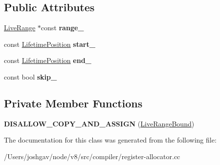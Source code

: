 \subsection*{Public Attributes}
\begin{DoxyCompactItemize}
\item 
\hyperlink{classv8_1_1internal_1_1compiler_1_1_live_range}{Live\+Range} $\ast$const {\bfseries range\+\_\+}\hypertarget{classv8_1_1internal_1_1compiler_1_1_live_range_bound_a31adf66742f8c0b7101392328558ba8a}{}\label{classv8_1_1internal_1_1compiler_1_1_live_range_bound_a31adf66742f8c0b7101392328558ba8a}

\item 
const \hyperlink{classv8_1_1internal_1_1compiler_1_1_lifetime_position}{Lifetime\+Position} {\bfseries start\+\_\+}\hypertarget{classv8_1_1internal_1_1compiler_1_1_live_range_bound_ad9828b4ba38126285be60185a0d3e0f8}{}\label{classv8_1_1internal_1_1compiler_1_1_live_range_bound_ad9828b4ba38126285be60185a0d3e0f8}

\item 
const \hyperlink{classv8_1_1internal_1_1compiler_1_1_lifetime_position}{Lifetime\+Position} {\bfseries end\+\_\+}\hypertarget{classv8_1_1internal_1_1compiler_1_1_live_range_bound_a509a46a71e1d7606c1502d597c06fda5}{}\label{classv8_1_1internal_1_1compiler_1_1_live_range_bound_a509a46a71e1d7606c1502d597c06fda5}

\item 
const bool {\bfseries skip\+\_\+}\hypertarget{classv8_1_1internal_1_1compiler_1_1_live_range_bound_a68eec38cf69856f02946373b3218d676}{}\label{classv8_1_1internal_1_1compiler_1_1_live_range_bound_a68eec38cf69856f02946373b3218d676}

\end{DoxyCompactItemize}
\subsection*{Private Member Functions}
\begin{DoxyCompactItemize}
\item 
{\bfseries D\+I\+S\+A\+L\+L\+O\+W\+\_\+\+C\+O\+P\+Y\+\_\+\+A\+N\+D\+\_\+\+A\+S\+S\+I\+GN} (\hyperlink{classv8_1_1internal_1_1compiler_1_1_live_range_bound}{Live\+Range\+Bound})\hypertarget{classv8_1_1internal_1_1compiler_1_1_live_range_bound_ae6dfdf52adfcbe4af9702e4c6a0ed182}{}\label{classv8_1_1internal_1_1compiler_1_1_live_range_bound_ae6dfdf52adfcbe4af9702e4c6a0ed182}

\end{DoxyCompactItemize}


The documentation for this class was generated from the following file\+:\begin{DoxyCompactItemize}
\item 
/\+Users/joshgav/node/v8/src/compiler/register-\/allocator.\+cc\end{DoxyCompactItemize}
